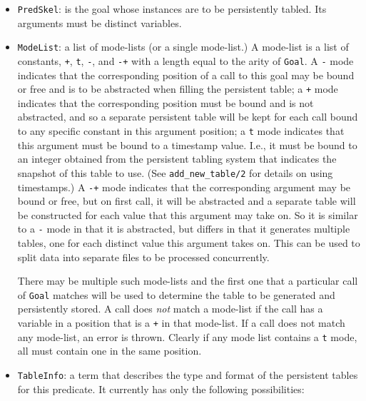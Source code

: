 \begin{itemize}

\item{{\tt PredSkel}}: is the goal whose instances are to be persistently
tabled.  Its arguments must be distinct variables.

\item{{\tt ModeList}}: a list of mode-lists (or a single mode-list.)
A mode-list is a list of constants, {\tt +}, {\tt t}, {\tt -}, and
{\tt -+} with a length equal to the arity of {\tt Goal}.  
A {\tt -} mode indicates that the corresponding position of a call to
this goal may be bound or free and is to be abstracted when filling
the persistent table; a {\tt +} mode indicates that the
corresponding position must be bound and is not abstracted, and so a
separate persistent table will be kept for each call bound to any
specific constant in this argument position; a {\tt t} mode
indicates that this argument must be bound to a timestamp value.
I.e., it must be bound to an integer obtained from the persistent
tabling system that indicates the snapshot of this table to use.  (See
{\tt add\_new\_table/2} for details on using timestamps.)  A
{\tt -+} mode indicates that the corresponding argument may be
bound or free, but on first call, it will be abstracted and a separate
table will be constructed for each value that this argument may take
on.  So it is similar to a {\tt -} mode in that it is abstracted,
but differs in that it generates multiple tables, one for each
distinct value this argument takes on.  This can be used to split data
into separate files to be processed concurrently. 


There may be multiple such mode-lists and the first one that a
particular call of {\tt Goal} matches will be used to determine the
table to be generated and persistently stored.  A call does {\em not}
match a mode-list if the call has a variable in a position that is a
{\tt +} in that mode-list.  If a call does not match any mode-list, an
error is thrown.  Clearly if any mode list contains a {\tt t} mode, all
must contain one in the same position.  

\item{{\tt TableInfo}}: a term that describes the type and format of
the persistent tables for this predicate.  It currently has only the
following possibilities:


\end{itemize}

